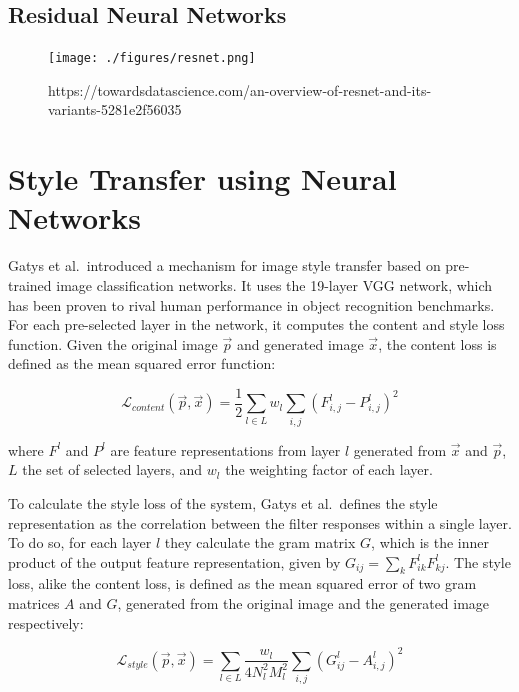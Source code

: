 \documentclass[]{report}
\begin{document}
\hypertarget{residual-neural-networks}{%
\subsection{Residual Neural Networks}\label{residual-neural-networks}}

\begin{figure}[h]
    \texttt{[image: ./figures/resnet.png]}
    \centering
    \caption{https://towardsdatascience.com/an-overview-of-resnet-and-its-variants-5281e2f56035}
\end{figure}

\hypertarget{style-transfer-using-neural-networks}{%
\section{Style Transfer using Neural
Networks}\label{style-transfer-using-neural-networks}}

Gatys et al.~introduced a mechanism for image style transfer based on
pre-trained image classification networks. It uses the 19-layer VGG
network, which has been proven to rival human performance in object
recognition benchmarks. For each pre-selected layer in the network, it
computes the content and style loss function. Given the original image
\(\vec{p}\) and generated image \(\vec{x}\), the content loss is defined
as the mean squared error function:

\begin{equation}
    \mathcal{L}_{content}(\vec{p}, \vec{x}) = \frac{1}{2} \sum_{l \in L} w_l \sum_{i,j} (F^l_{i, j} - P^l_{i, j})^2
\end{equation}

where \(F^l\) and \(P^l\) are feature representations from layer \(l\)
generated from \(\vec{x}\) and \(\vec{p}\), \(L\) the set of selected
layers, and \(w_l\) the weighting factor of each layer.

To calculate the style loss of the system, Gatys et al.~defines the
style representation as the correlation between the filter responses
within a single layer. To do so, for each layer \(l\) they calculate the
gram matrix \(G\), which is the inner product of the output feature
representation, given by \(G_{ij} = \sum_{k} F^l_{ik} F^l_{kj}\). The
style loss, alike the content loss, is defined as the mean squared error
of two gram matrices \(A\) and \(G\), generated from the original image
and the generated image respectively:

\begin{equation}
    \mathcal{L}_{style}(\vec{p}, \vec{x}) =  \sum_{l \in L} \frac{w_l}{4 N_l^2 M_l^2} \sum_{i, j} (G^l_{ij} - A^l_{i, j})^2
\end{equation}
\end{document}
